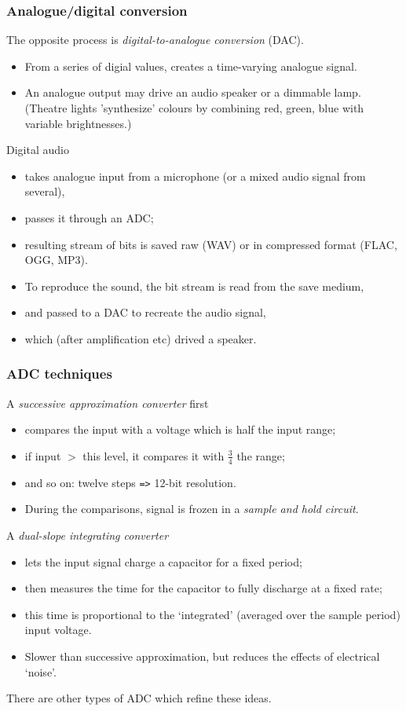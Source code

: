 \documentclass[10pt]{beamer}
\begin{document}
\begin{frame}
\frametitle{Analogue/digital conversion}
The opposite process is \emph{digital-to-analogue conversion} (DAC). 
\begin{itemize}
\item From a series of digial values, creates a time-varying analogue signal.
\item An analogue output may drive an audio speaker or a dimmable lamp. (Theatre lights 'synthesize' colours by combining red, green, blue with variable brightnesses.)
\end{itemize}

Digital audio
\begin{itemize}
\item takes analogue input from a microphone (or a mixed audio signal from several), 
\item passes it through an ADC;
\item resulting stream of bits is saved raw (WAV) or in compressed format (FLAC, OGG, MP3).
\item To reproduce the sound, the bit stream is read from the save medium,
\item and passed to a DAC to recreate the audio signal,
\item which (after amplification etc) drived a speaker.
\end{itemize}
\end{frame}

\begin{frame}
\frametitle{ADC techniques}
A \emph{successive approximation converter} first
\begin{itemize}
\item compares the input with a voltage which is half the input range;
\item if input $>$ this level, it compares it with $\frac{3}{4}$ the range;
\item and so on: twelve steps \texttt{=>} 12-bit resolution.
\item During the comparisons, signal is frozen in a \emph{sample and hold circuit}.
\end{itemize}

A \emph{dual-slope integrating converter} 
\begin{itemize}
\item lets the input signal charge a capacitor for a fixed period;
\item then measures the time for the capacitor to fully discharge at a fixed rate;
\item this time is proportional to the `integrated' (averaged over the sample period) input voltage.
\item Slower than successive approximation, but reduces the effects of electrical `noise'.
\end{itemize}

There are other types of ADC which refine these ideas.
\end{frame}
\end{document}
